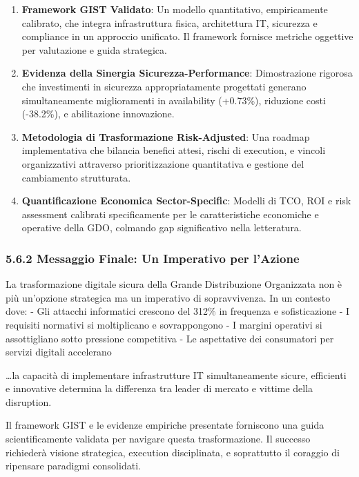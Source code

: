 \documentclass{report}
\begin{document}
\begin{enumerate}
\def\labelenumi{\arabic{enumi}.}
\item
  \textbf{Framework GIST Validato}: Un modello quantitativo,
  empiricamente calibrato, che integra infrastruttura fisica,
  architettura IT, sicurezza e compliance in un approccio unificato. Il
  framework fornisce metriche oggettive per valutazione e guida
  strategica.
\item
  \textbf{Evidenza della Sinergia Sicurezza-Performance}: Dimostrazione
  rigorosa che investimenti in sicurezza appropriatamente progettati
  generano simultaneamente miglioramenti in availability (+0.73\%),
  riduzione costi (-38.2\%), e abilitazione innovazione.
\item
  \textbf{Metodologia di Trasformazione Risk-Adjusted}: Una roadmap
  implementativa che bilancia benefici attesi, rischi di execution, e
  vincoli organizzativi attraverso prioritizzazione quantitativa e
  gestione del cambiamento strutturata.
\item
  \textbf{Quantificazione Economica Sector-Specific}: Modelli di TCO,
  ROI e risk assessment calibrati specificamente per le caratteristiche
  economiche e operative della GDO, colmando gap significativo nella
  letteratura.
\end{enumerate}

\subsubsection{5.6.2 Messaggio Finale: Un Imperativo per
l'Azione}\label{messaggio-finale-un-imperativo-per-lazione}

La trasformazione digitale sicura della Grande Distribuzione Organizzata
non è più un'opzione strategica ma un imperativo di sopravvivenza. In un
contesto dove: - Gli attacchi informatici crescono del 312\% in
frequenza e sofisticazione - I requisiti normativi si moltiplicano e
sovrappongono - I margini operativi si assottigliano sotto pressione
competitiva - Le aspettative dei consumatori per servizi digitali
accelerano

\ldots la capacità di implementare infrastrutture IT simultaneamente
sicure, efficienti e innovative determina la differenza tra leader di
mercato e vittime della disruption.

Il framework GIST e le evidenze empiriche presentate forniscono una
guida scientificamente validata per navigare questa trasformazione. Il
successo richiederà visione strategica, execution disciplinata, e
soprattutto il coraggio di ripensare paradigmi consolidati.
\end{document}
